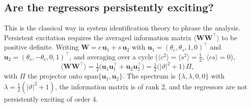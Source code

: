 \documentclass[11pt]{article}
\newcommand{\vW}{\mathbf{W}}
\begin{document}


\subsection{Are the regressors persistently exciting?}
\label{sec:pe}

This is the classical way in system identification theory to phrase the analysis.
%
Persistent excitation requires the averaged information matrix $\langle\vW\vW^\top\rangle$ to be positive definite.
%
Writing
$\vW=c\,\mathbf{u}_1+s\,\mathbf{u}_2$ with
$\mathbf{u}_1=(\theta_c,\theta_s,1,0)^\top$ and
$\mathbf{u}_2=(\theta_s,-\theta_c,0,1)^\top$, and averaging over a cycle
($\langle c^2\rangle=\langle s^2\rangle=\tfrac12$, $\langle cs\rangle=0$),
%
\begin{equation}
  \langle\vW\vW^\top\rangle
  =\tfrac12\big(\mathbf{u}_1\mathbf{u}_1^\top+\mathbf{u}_2\mathbf{u}_2^\top\big)
  =\tfrac12\big(|\vartheta|^2+1\big)\,\Pi ,
  \label{eq:info}
\end{equation}
%
with $\Pi$ the projector onto $\mathrm{span}\{\mathbf{u}_1,\mathbf{u}_2\}$.
%
The spectrum is $\{\lambda,\lambda,0,0\}$ with $\lambda=\tfrac12(|\vartheta|^2+1)$, the information matrix is of rank 2, and the regressors are not persistently exciting of order 4.
\end{document}
